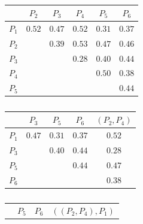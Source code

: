 \documentclass[12pt, a4paper]{article}
\begin{document}
\begin{latin}
    \begin{table}[h]
        \caption{}
        \label{compelete_linkage}
        \begin{subtable}{0.45\linewidth}
            \caption{}
            \begin{tabular}{c|c|c|c|c|c}
                & $P_2$  & $P_3$  & $P_4$                        & $P_5$  & $P_6$  \\
                \hline
                $P_1$ & $0.52$ & $0.47$ & $0.52$                       & $0.31$ & $0.37$ \\
                \hline
                $P_2$ &        & $0.39$ & \cellcolor{purple!30} $0.53$ & $0.47$ & $0.46$ \\
                \hline
                $P_3$ &        &        & $0.28$                       & $0.40$ & $0.44$ \\
                \hline
                $P_4$ &        &        &                              & $0.50$ & $0.38$ \\
                \hline
                $P_5$ &        &        &                              &        & $0.44$ \\
            \end{tabular}
        \end{subtable}
        \hfill
        \begin{subtable}{0.45\linewidth}
            \caption{}
            \begin{tabular}{c|c|c|c|c}
                & $P_3$  & $P_5$  & $P_6$  & $(P_2, P_4)$ \\
                \hline
                $P_1$ & $0.47$ & $0.31$ & $0.37$ & \cellcolor{purple!30} $0.52$ \\
                \hline
                $P_3$ &        & $0.40$ & $0.44$ & $0.28$ \\
                \hline
                $P_5$ &        &        & $0.44$ & $0.47$ \\
                \hline
                $P_6$ &        &        &        & $0.38$ \\
            \end{tabular}
        \end{subtable}
        \newline
        \begin{subtable}{0.45\linewidth}
            \caption{}
            \begin{tabular}{c|c|c|c}
                & $P_5$  & $P_6$                        & $((P_2, P_4), P_1)$ \\

\end{tabular}
\end{subtable}
\end{table}
\end{latin}
\end{document}
